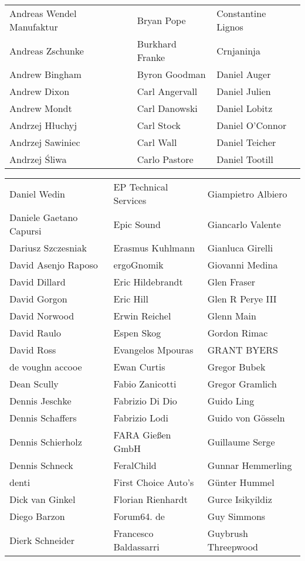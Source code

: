 \begin{tabular}{p{4.5cm}p{4.5cm}p{4.5cm}}
Andreas Wendel Manufaktur & Bryan Pope & Constantine Lignos \\
Andreas Zschunke & Burkhard Franke & Crnjaninja \\
Andrew Bingham & Byron Goodman & Daniel Auger \\
Andrew Dixon & Carl Angervall & Daniel Julien \\
Andrew Mondt & Carl Danowski & Daniel Lobitz \\
Andrzej Hłuchyj & Carl Stock & Daniel O'Connor \\
Andrzej Sawiniec & Carl Wall & Daniel Teicher \\
Andrzej Śliwa & Carlo Pastore & Daniel Tootill \\
\end{tabular}
\newpage
\setlength{\tabcolsep}{1mm}
\begin{tabular}{p{4.5cm}p{4.5cm}p{4.5cm}}
Daniel Wedin & EP Technical Services & Giampietro Albiero \\
Daniele Gaetano Capursi & Epic Sound & Giancarlo Valente \\
Dariusz Szczesniak & Erasmus Kuhlmann & Gianluca Girelli \\
David Asenjo Raposo & ergoGnomik & Giovanni Medina \\
David Dillard & Eric Hildebrandt & Glen Fraser \\
David Gorgon & Eric Hill & Glen R Perye III \\
David Norwood & Erwin Reichel & Glenn Main \\
David Raulo & Espen Skog & Gordon Rimac \\
David Ross & Evangelos Mpouras & GRANT BYERS \\
de voughn accooe & Ewan Curtis & Gregor Bubek \\
Dean Scully & Fabio Zanicotti & Gregor Gramlich \\
Dennis Jeschke & Fabrizio Di Dio & Guido Ling \\
Dennis Schaffers & Fabrizio Lodi & Guido von Gösseln \\
Dennis Schierholz & FARA Gießen GmbH & Guillaume Serge \\
Dennis Schneck & FeralChild & Gunnar Hemmerling \\
denti & First Choice Auto's & Günter Hummel \\
Dick van Ginkel & Florian Rienhardt & Gurce Isikyildiz \\
Diego Barzon & Forum64. de & Guy Simmons \\
Dierk Schneider & Francesco Baldassarri & Guybrush Threepwood \\

\end{tabular}
